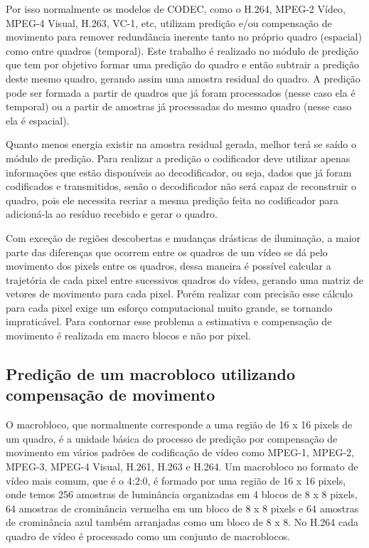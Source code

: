 Por isso normalmente os modelos de CODEC, como o H.264, MPEG-2 Vídeo, MPEG-4 Visual, H.263, VC-1, etc, utilizam predição e/ou compensação de movimento para remover redundância inerente tanto no próprio quadro (espacial) como entre quadros (temporal). Este trabalho é realizado no módulo de predição que tem por objetivo formar uma predição do quadro e então subtrair a predição deste mesmo quadro, gerando assim uma amostra residual do quadro. A predição pode ser formada a partir de quadros que já foram processados (nesse caso ela é temporal) ou a partir de amostras já processadas do mesmo quadro (nesse caso ela é espacial).

Quanto menos energia existir na amostra residual gerada, melhor terá se saído o módulo de predição. Para realizar a predição o codificador deve utilizar apenas informações que estão disponíveis ao decodificador, ou seja, dados que já foram codificados e transmitidos, senão o decodificador não será capaz de reconstruir o quadro, pois ele necessita recriar a mesma predição feita no codificador para adicioná-la ao resíduo recebido e gerar o quadro.

Com exceção de regiões descobertas e mudanças drásticas de iluminação, a maior parte das diferenças que ocorrem entre os quadros de um vídeo se dá pelo movimento dos pixels entre os quadros, dessa maneira é possível calcular a trajetória de cada pixel entre sucessivos quadros do vídeo, gerando uma matriz de vetores de movimento para cada pixel. Porém realizar com precisão esse cálculo para cada pixel exige um esforço computacional muito grande, se tornando impraticável. Para contornar esse problema a estimativa e compensação de movimento é realizada em macro blocos e não por pixel.

\subsection{Predição de um macrobloco utilizando compensação de movimento}

O macrobloco, que normalmente corresponde a uma região de 16 x 16 pixels de um quadro, é a unidade básica do processo de predição por compensação de movimento em vários padrões de codificação de vídeo como MPEG-1, MPEG-2, MPEG-3, MPEG-4 Visual, H.261, H.263 e H.264. Um macrobloco no formato de vídeo mais comum, que é o 4:2:0, é formado por uma região de 16 x 16 pixels, onde temos 256 amostras de luminância organizadas em 4 blocos de 8 x 8 pixels, 64 amostras de crominância vermelha em um bloco de 8 x 8 pixels e 64 amostras de crominância azul também arranjadas como um bloco de 8 x 8. No H.264 cada quadro de vídeo é processado como um conjunto de macroblocos.


